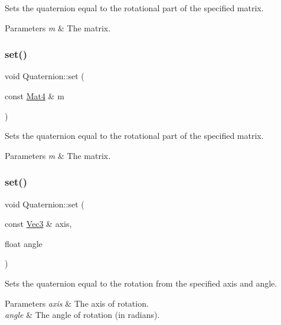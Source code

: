 Sets the quaternion equal to the rotational part of the specified matrix.


\begin{DoxyParams}{Parameters}
{\em m} & The matrix. \\
\hline
\end{DoxyParams}
\mbox{\label{classQuaternion_ae51fe27416ac31583a4442cc0b8b2252}} 
\subsubsection{\texorpdfstring{set()}{set()}\hspace{0.1cm}{\footnotesize\ttfamily [6/10]}}
{\footnotesize\ttfamily void Quaternion\+::set (\begin{DoxyParamCaption}\item[{const \hyperlink{classMat4}{Mat4} \&}]{m }\end{DoxyParamCaption})}

Sets the quaternion equal to the rotational part of the specified matrix.


\begin{DoxyParams}{Parameters}
{\em m} & The matrix. \\
\hline
\end{DoxyParams}
\mbox{\label{classQuaternion_a27ac949226c34a565311aee0a10d61dc}} 
\subsubsection{\texorpdfstring{set()}{set()}\hspace{0.1cm}{\footnotesize\ttfamily [7/10]}}
{\footnotesize\ttfamily void Quaternion\+::set (\begin{DoxyParamCaption}\item[{const \hyperlink{classVec3}{Vec3} \&}]{axis,  }\item[{float}]{angle }\end{DoxyParamCaption})}

Sets the quaternion equal to the rotation from the specified axis and angle.


\begin{DoxyParams}{Parameters}
{\em axis} & The axis of rotation. \\
\hline
{\em angle} & The angle of rotation (in radians). \\
\hline
\end{DoxyParams}
\mbox{\label{classQuaternion_a27ac949226c34a565311aee0a10d61dc}} 

